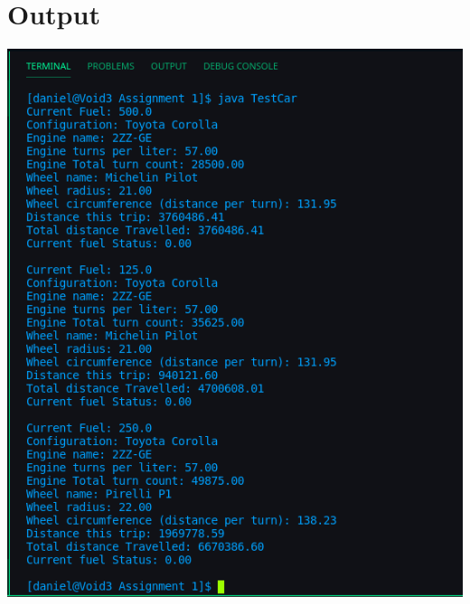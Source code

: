 \documentclass{article}
\begin{document}
	\section{Output}
	\includegraphics{testoutput.png}
\end{document}
